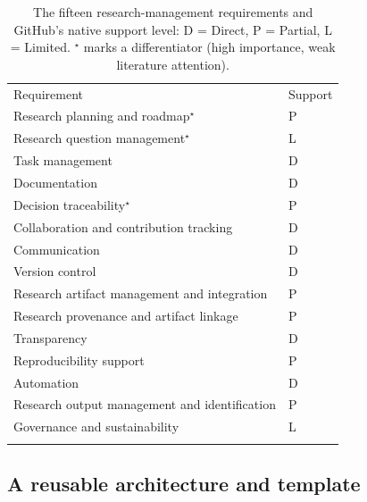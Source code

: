 \documentclass{IEEEcsmag}
\begin{document}
\begin{table}[t]
\caption{The fifteen research-management requirements and GitHub's native support level: D = Direct, P = Partial, L = Limited. $^\star$ marks a differentiator (high importance, weak literature attention).}\label{tab:requirements}
\tablefont
\begin{tabular*}{17.5pc}{@{}p{175pt}p{40pt}<{\raggedright}@{}}
\toprule
Requirement& Support\\
\colrule
Research planning and roadmap$^\star$& P\\
Research question management$^\star$& L\\
Task management& D\\
Documentation& D\\
Decision traceability$^\star$& P\\
Collaboration and contribution tracking& D\\
Communication& D\\
Version control& D\\
Research artifact management and integration& P\\
Research provenance and artifact linkage& P\\
Transparency& D\\
Reproducibility support& P\\
Automation& D\\
Research output management and identification& P\\
Governance and sustainability& L\\
\botrule
\end{tabular*}
\end{table}

\subsection{A reusable architecture and template}
\end{document}
